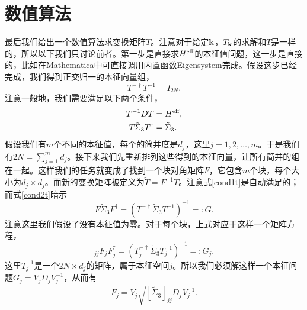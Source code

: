 \section{数值算法}
最后我们给出一个数值算法求变换矩阵$T$。注意对于给定$\vb k$，$T_{\vb k}$的求解和$T$是一样的，所以以下我们只讨论前者。第一步是直接求$H^{\text{eff}}$的本征值问题，这一步是直接的，比如在Mathematica中可直接调用内置函数Eigensystem完成。假设这步已经完成，我们得到正交归一的本征向量组，
\begin{equation}
  T^{-\dagger} T^{-1} = I_{2N}.
\end{equation}
注意一般地，我们需要满足以下两个条件，
\begin{subequations}
    \begin{align}
        T^{-1} DT &=H^{\text{eff}},\label{cond1t} \\
        T\tilde \Sigma_3 T^\dagger &= \tilde \Sigma_3.\label{cond2t}
    \end{align}
\end{subequations}
假设我们有$m$个不同的本征值，每个的简并度是$d_j$，这里$j=1,2,\dots,m$。于是我们有$2N=\sum_{j=1}^m d_j$。接下来我们先重新排列这些得到的本征向量，让所有简并的组在一起。这样我们的任务就变成了找到一个块对角矩阵$F$，它包含$m$个块，每个大小为$d_j\times d_j$。而新的变换矩阵被定义为$\tilde T= F^{-1} T$。注意式\eqref{cond1t}是自动满足的；而式\eqref{cond2t}暗示
\begin{equation}
  F\tilde \Sigma_3 F^\dagger = (T^{-\dagger} \tilde \Sigma_3 T^{-1})^{-1} =: G.
\end{equation}
注意这里我们假设了没有本征值为零。对于每个块，上式对应于这样一个矩阵方程，
\begin{equation}
  [\tilde \Sigma_3]_{jj} F_j F^\dagger_j = (T_j^{-\dagger} \tilde \Sigma_3 T_j^{-1} )^{-1} =: G_j.
\end{equation}
这里$T_j^{-1}$是一个$2N\times d_j$的矩阵，属于本征空间$j$。所以我们必须解这样一个本征问题$G_j = V_j D_j V^{-1}_j$，从而有
\begin{equation}
  F_j = V_j \sqrt{[\tilde \Sigma_3]_{jj} D_j} V_j^{-1}.
\end{equation}













